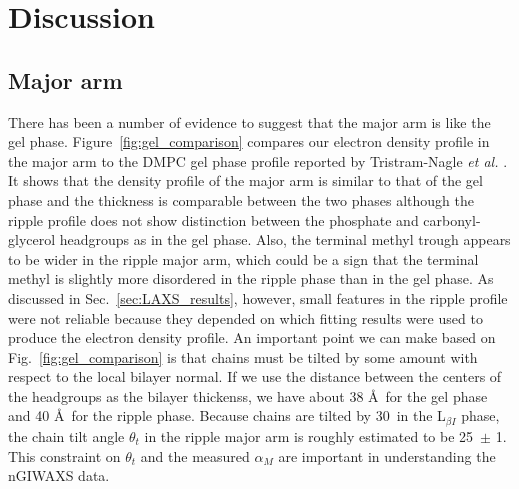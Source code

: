 
\newpage
\section{Discussion}\label{sec:ripple_discussion}
\subsection{Major arm}
There has been a number of evidence to suggest that the major arm is like 
the gel phase. Figure~\ref{fig:gel_comparison} compares our electron density
profile in the major arm to the DMPC gel phase profile reported by 
Tristram-Nagle \textit{et al.} \cite{Tristram-Nagle02}. 
It shows that the density profile of the major arm is similar to that 
of the gel phase and the thickness is comparable between the two phases
although the ripple profile does not show distinction
between the phosphate and carbonyl-glycerol headgroups as in the gel phase.
Also, the terminal methyl trough appears to be wider in the ripple major arm,
which could be a sign that the terminal methyl is slightly more disordered
in the ripple phase than in the gel phase.
As discussed in
Sec.~\ref{sec:LAXS_results}, however, small features in the ripple profile were not
reliable because they depended on which fitting results were used
to produce the electron density profile.
An important point we can make based on Fig.~\ref{fig:gel_comparison} 
is that chains must be tilted by some amount with respect to the local bilayer
normal. If we use the distance between the centers of the headgroups as the
bilayer thickenss, we have about 38 \AA\ for the gel phase and 40 \AA\
for the ripple phase. Because chains are tilted by 30\textdegree\ in the 
L$_{\beta I}$ phase, the chain tilt angle $\theta_t$ in the ripple major 
arm is roughly estimated to be 25\textdegree\ $\pm$ 1\textdegree. This constraint on $\theta_t$
and the measured $\alpha_M$ are important in understanding the nGIWAXS data.

